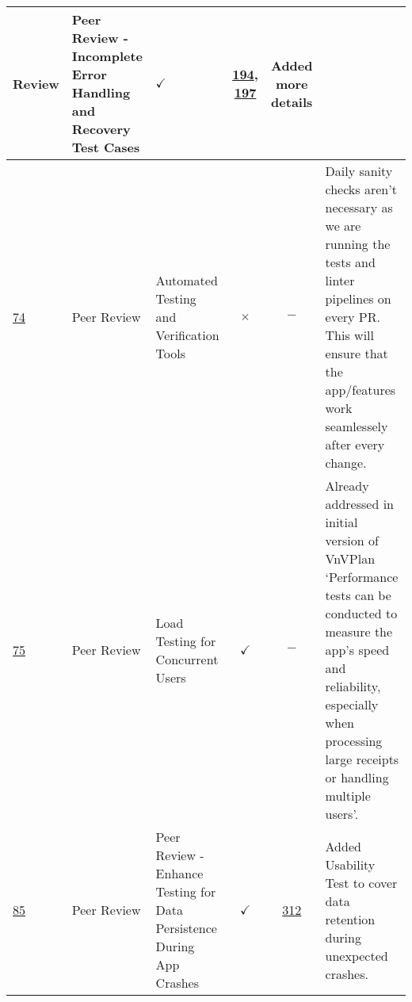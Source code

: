 \documentclass{article}
\begin{document}
\begin{table}[H]
{\begin{tabular}{p{1.5cm} p{2cm} p{3.5cm} c c p{4cm}}
        Review & Peer Review - Incomplete Error Handling and Recovery Test Cases
        & $\checkmark$ & \href{https://github.com/PlutosCapstone/Plutos/pull/194}{194},
        \href{https://github.com/PlutosCapstone/Plutos/pull/197}{197} & Added
        more details  \\
        \hline
        \href{https://github.com/PlutosCapstone/Plutos/issues/74}{74} & Peer
        Review & Automated Testing and Verification Tools & $\times$ & $-$ &  Daily
        sanity checks aren't necessary as we are running the tests and linter
        pipelines on every PR. This will ensure that the app/features work
        seamlessely after every change. \\ 
        \hline
        \href{https://github.com/PlutosCapstone/Plutos/issues/75}{75} & Peer
        Review & Load Testing for Concurrent Users & $\checkmark$ &
        $-$ &  Already
        addressed in initial version of VnVPlan `Performance tests can be
        conducted to measure the app's speed and reliability, especially when
        processing large receipts or handling multiple users'. \\ \hline
        \href{https://github.com/PlutosCapstone/Plutos/issues/85}{85} & Peer
        Review & Peer Review - Enhance Testing for Data Persistence During App
        Crashes & $\checkmark$ & \href{https://github.com/PlutosCapstone/Plutos/pull/312}{312} &
        Added Usability Test to cover data retention during unexpected crashes.\\ 
    \bottomrule
    \end{tabular}%
    }
\end{table}
\end{document}

